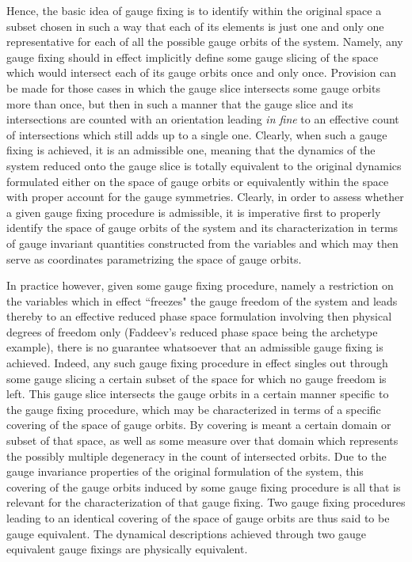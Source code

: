 \documentclass[a4paper,11pt]{article}
\begin{document}
Hence, the basic idea of gauge fixing is to identify within the original
space \coordHE{} a subset chosen in such a way that each of
its elements is just one and only one representative for each of all the
possible gauge orbits of the system. Namely, any gauge fixing should in
effect implicitly define some gauge slicing of the space 
\coordHE{} which would intersect each of its gauge orbits
once and only once. Provision can be made for those cases in which the
gauge slice intersects some gauge orbits more than once, but then in such
a manner that the gauge slice and its intersections are counted with
an orientation leading {\sl in fine\/} to an effective count of intersections
which still adds up to a single one. Clearly, when such a gauge fixing
is achieved, it is an admissible one, meaning that the dynamics of
the system reduced onto the gauge slice is totally equivalent to the
original dynamics formulated either on the space of gauge orbits or
equivalently within the space \coordHE{} with proper
account for the gauge symmetries. Clearly, in order to assess whether
a given gauge fixing procedure is admissible, it is imperative first
to properly identify the space of gauge orbits of the system and its
characterization in terms of gauge invariant quantities constructed
from the variables \coordHE{} and which may then serve as
coordinates parametrizing the space of gauge orbits.

In practice however, given some gauge fixing procedure, namely a restriction
on the variables \coordHE{} which in effect ``freezes" the
gauge freedom of the system and leads thereby to an effective reduced
phase space formulation involving then physical degrees of freedom only
(Faddeev's reduced phase space being the archetype example), there is no
guarantee whatsoever that an admissible gauge fixing is achieved.
Indeed, any such gauge fixing procedure in effect singles out through some
gauge slicing a certain subset of the space \coordHE{}
for which no gauge freedom is left. This gauge slice intersects the
gauge orbits in a certain manner specific to the gauge fixing procedure,
which may be characterized in terms of a specific covering of the space
of gauge orbits.\cite{JG1} By covering is meant a certain domain or subset 
of that space, as well as some measure over that domain which represents the
possibly multiple degeneracy in the count of intersected orbits.
Due to the gauge invariance properties of the original formulation of
the system, this covering of the gauge orbits induced by some gauge
fixing procedure is all that is relevant for the characterization of
that gauge fixing. Two gauge fixing procedures leading to an identical
covering of the space of gauge orbits are thus said to be gauge equivalent.
The dynamical descriptions achieved through two gauge equivalent gauge
fixings are physically equivalent.
\end{document}
